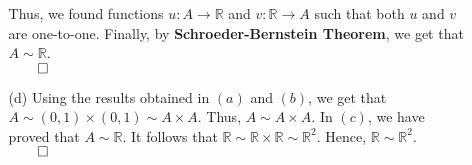 \documentclass[11pt]{article}
\newcommand{\reals}{\mathbb{R}}
\begin{document}
\begin{itemize}
\begin{itemize}
                    Thus, we found functions $u : A \to \reals$ and $v : \reals
                    \to A$ such that both $u$ and $v$ are one-to-one. Finally,
                    by \textbf{Schroeder-Bernstein Theorem}, we get that $A
                    \sim \reals$.\\
                    $\qed$

                \item[(d)]
                    Using the results obtained in $(a)$ and $(b)$, we get that
                    $A \sim (0, 1) \times (0, 1) \sim A \times A$. Thus, $A
                    \sim A \times A$. In $(c)$, we have proved that $A \sim
                    \reals$.  It follows that $\reals \sim \reals \times \reals
                    \sim \reals^2$. Hence, $\reals \sim \reals^2$.\\
                    $\qed$
            \end{itemize}
\end{itemize}

\end{document}

